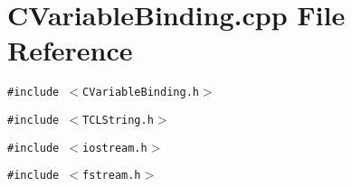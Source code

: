 \section{CVariable\-Binding.cpp File Reference}
\label{CVariableBinding_8cpp}
{\tt \#include $<$CVariable\-Binding.h$>$}\par
{\tt \#include $<$TCLString.h$>$}\par
{\tt \#include $<$iostream.h$>$}\par
{\tt \#include $<$fstream.h$>$}\par

